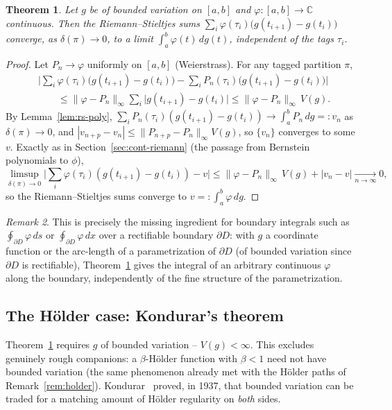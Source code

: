 \documentclass[11pt,fleqn]{article}
\def\C{\mathbb C}
\theoremstyle{plain}
\newtheorem{thm}{Theorem}[section]
\theoremstyle{remark}
\newtheorem{remark}[thm]{Remark}
\begin{document}
\begin{thm}\label{thm:rs-continuous}
Let $g$ be of bounded variation on $[a,b]$ and $\varphi\colon[a,b]\to\C$
continuous. Then the Riemann--Stieltjes sums
$\sum_i\varphi(\tau_i)\big(g(t_{i+1})-g(t_i)\big)$ converge, as
$\delta(\pi)\to0$, to a limit $\int_a^b\varphi(t)\,dg(t)$, independent of
the tags $\tau_i$.
\end{thm}
\begin{proof}
Let $P_n\to\varphi$ uniformly on $[a,b]$ (Weierstrass). For any tagged
partition $\pi$,
\begin{align*}
&\Big|\sum_i\varphi(\tau_i)\big(g(t_{i+1})-g(t_i)\big)
-\sum_iP_n(\tau_i)\big(g(t_{i+1})-g(t_i)\big)\Big|\\
&\qquad\le\|\varphi-P_n\|_\infty\sum_i\big|g(t_{i+1})-g(t_i)\big|
\le\|\varphi-P_n\|_\infty\,V(g).
\end{align*}
By Lemma~\ref{lem:rs-poly}, $\sum_iP_n(\tau_i)(g(t_{i+1})-g(t_i))\to
\int_a^bP_n\,dg=:v_n$ as $\delta(\pi)\to0$, and $|v_{n+p}-v_n|\le
\|P_{n+p}-P_n\|_\infty V(g)$, so $\{v_n\}$ converges to some $v$. Exactly
as in Section~\ref{sec:cont-riemann} (the passage from Bernstein polynomials to $\phi$),
\[
\limsup_{\delta(\pi)\to0}\Big|\sum_i\varphi(\tau_i)(g(t_{i+1})-g(t_i))-v\Big|
\le\|\varphi-P_n\|_\infty\,V(g)+|v_n-v|\xrightarrow[n\to\infty]{}0,
\]
so the Riemann--Stieltjes sums converge to $v=:\int_a^b\varphi\,dg$.
\end{proof}

\begin{remark}
This is precisely the missing ingredient for boundary integrals such as
$\oint_{\partial D}\varphi\,ds$ or $\oint_{\partial D}\varphi\,dx$ over a
rectifiable boundary $\partial D$: with $g$ a coordinate function or the
arc-length of a parametrization of $\partial D$ (of bounded variation
since $\partial D$ is rectifiable), Theorem~\ref{thm:rs-continuous} gives
the integral of an arbitrary continuous $\varphi$ along the boundary,
independently of the fine structure of the parametrization.
\end{remark}

\subsection{The H\"older case: Kondurar's theorem}
\label{sec:kondurar}

Theorem~\ref{thm:rs-continuous} requires $g$ of bounded variation --
$V(g)<\infty$. This excludes genuinely rough companions: a
$\beta$-H\"older function with $\beta<1$ need not have bounded variation
(the same phenomenon already met with the H\"older paths of
Remark~\ref{rem:holder}). Kondurar~\cite{K} proved, in 1937, that bounded
variation can be traded for a matching amount of H\"older regularity on
\emph{both} sides.
\end{document}
